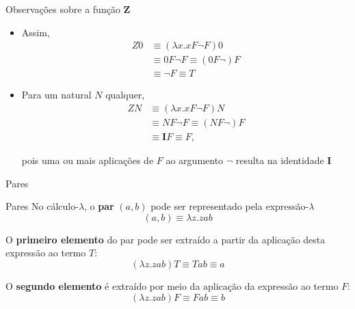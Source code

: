 \begin{frame}[fragile]{Observações sobre a função $\mathbf{Z}$}

    \begin{itemize}
        \item Assim,
        \begin{align*}
            Z0 &\equiv (\lambda x.xF\lnot F)0 \\
            &\equiv 0F\lnot F \equiv (0F\lnot)F \\
            &\equiv \lnot F \equiv T
        \end{align*}
            
        \item Para um natural $N$ qualquer,
        \begin{align*}
            ZN &\equiv (\lambda x.xF\lnot F)N \\
            &\equiv NF\lnot F \equiv (NF\lnot)F \\
            &\equiv \mathbf{I} F \equiv F,
        \end{align*}
 
        pois uma ou mais aplicações de $F$ ao argumento $\lnot$ resulta na identidade $\mathbf{I}$
    \end{itemize}

\end{frame}

\begin{frame}[fragile]{Pares}

    \begin{block}{Pares}
    No cálculo-$\lambda$, o \textbf{par} $(a, b)$ pode ser representado pela expressão-$\lambda$
    \[
        (a, b) \equiv \lambda z.zab
    \]

    O \textbf{primeiro elemento} do par pode ser extraído a partir da aplicação desta expressão ao
        termo $T$:
    \[
        (\lambda z.zab)T \equiv Tab \equiv a
    \]

    O \textbf{segundo elemento} é extraído por meio da aplicação da expressão ao termo $F$:
    \[
        (\lambda z.zab)F \equiv Fab \equiv b
    \]
    \end{block}

\end{frame}

